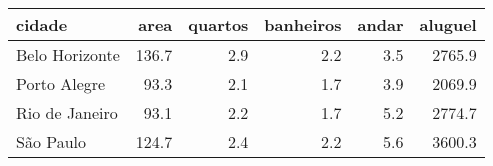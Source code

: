 
\begin{tabular}{l|r|r|r|r|r}
\hline
cidade & area & quartos & banheiros & andar & aluguel\\
\hline
Belo Horizonte & 136.7 & 2.9 & 2.2 & 3.5 & 2765.9\\
\hline
Porto Alegre & 93.3 & 2.1 & 1.7 & 3.9 & 2069.9\\
\hline
Rio de Janeiro & 93.1 & 2.2 & 1.7 & 5.2 & 2774.7\\
\hline
São Paulo & 124.7 & 2.4 & 2.2 & 5.6 & 3600.3\\
\hline
\end{tabular}
